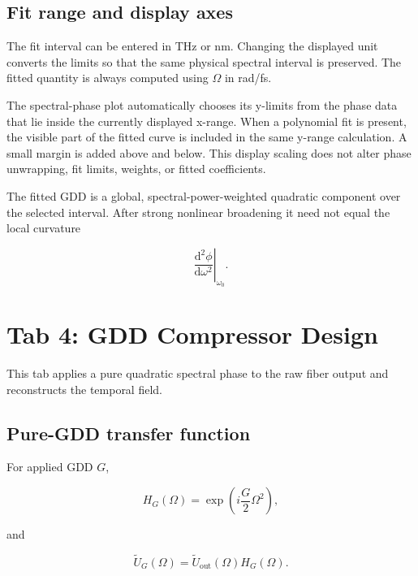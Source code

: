 \documentclass[11pt,a4paper]{article}
\newcommand{\dd}{\mathrm{d}}
\begin{document}
\subsection{Fit range and display axes}

The fit interval can be entered in THz or nm. Changing the displayed unit
converts the limits so that the same physical spectral interval is preserved.
The fitted quantity is always computed using $\Omega$ in rad/fs.

The spectral-phase plot automatically chooses its y-limits from the phase data
that lie inside the currently displayed x-range. When a polynomial fit is
present, the visible part of the fitted curve is included in the same y-range
calculation. A small margin is added above and below. This display scaling does
not alter phase unwrapping, fit limits, weights, or fitted coefficients.

The fitted GDD is a global, spectral-power-weighted quadratic component over the
selected interval. After strong nonlinear broadening it need not equal the
local curvature

\begin{equation}
\left.
\frac{\dd^2\phi}{\dd\omega^2}
\right|_{\omega_0}.
\end{equation}

\section{Tab 4: GDD Compressor Design}

This tab applies a pure quadratic spectral phase to the raw fiber output and
reconstructs the temporal field.

\subsection{Pure-GDD transfer function}

For applied GDD $G$,

\begin{equation}
\boxed{
H_G(\Omega)
=\exp\left(i\frac{G}{2}\Omega^2\right),
}
\end{equation}

and

\begin{equation}
\widetilde U_G(\Omega)
=
\widetilde U_{\mathrm{out}}(\Omega)H_G(\Omega).
\end{equation}
\end{document}
